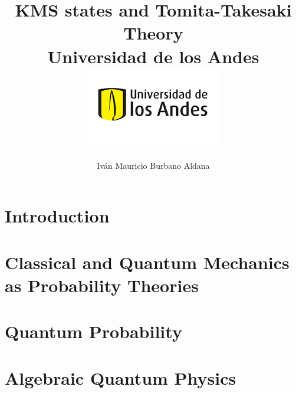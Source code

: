 \documentclass[12pt]{report}
\title 
{
	{KMS states and Tomita-Takesaki Theory}\\
	{\large Universidad de los Andes}\\
	{\includegraphics{logo.png}}	
}
\author{Iván Mauricio Burbano Aldana}
\theoremstyle{definition}
\begin{document}
\maketitle

\tableofcontents

\chapter{Introduction}

\chapter{Classical and Quantum Mechanics as Probability Theories}


\chapter{Quantum Probability}


\chapter{Algebraic Quantum Physics}



\end{document}
